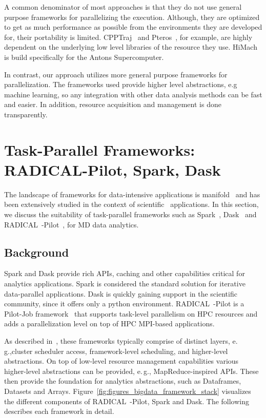 A common denominator of most approaches is that they do not use general purpose frameworks for parallelizing the execution.
Although, they are optimized to get as much performance as possible from the environments they are developed for, their portability is limited.
CPPTraj~\cite{roe2018parallelization} and Pteros~\cite{yesylevskyy2015pteros}, for example, are highly dependent on the underlying low level libraries of the resource they use.
HiMach~\cite{tiankai2008scalable} is build specifically for the Antons Supercomputer.

In contrast, our approach utilizes more general purpose frameworks for parallelization.
The frameworks used provide higher level abstractions, e.g machine learning, so any  integration with other data analysis methods can be fast and easier.
In addition, resource acquisition and management is done transparently.

\section{Task-Parallel Frameworks: RADICAL-Pilot, Spark, Dask}
\label{sec:frameworks}
The landscape of frameworks for data-intensive applications is manifold~\cite{jha2014tale,kamburugamuve2017anatomy} and has been extensively studied in the context of scientific~\cite{jha2017introducing} applications.
In this section, we discuss the suitability of task-parallel frameworks such as Spark~\cite{zaharia2010spark}, Dask~\cite{rocklin2015dask} and RADICAL~-Pilot~\cite{merzky2019using}, for MD data analytics.

\subsection{Background}
Spark and Dask provide rich APIs, caching and other capabilities critical for analytics applications.
Spark is considered the standard solution for iterative data-parallel applications.
Dask is quickly gaining support in the scientific community, since it offers only a python environment.
RADICAL~-Pilot is a Pilot-Job framework~\cite{luckow2012pstar} that supports task-level parallelism on HPC resources and adds a parallelization level on top of HPC MPI-based applications.

As described in~\cite{jha2014tale}, these frameworks typically comprise of distinct layers, e.\,g.,cluster scheduler access, framework-level scheduling, and higher-level abstractions.
On top of low-level resource management capabilities various higher-level abstractions can be provided, e.\,g., MapReduce-inspired APIs.
These then provide the foundation for analytics abstractions, such as Dataframes, Datasets and Arrays.
Figure~\ref{fig:figures_bigdata_framework_stack} visualizes the different components of RADICAL~-Pilot, Spark and Dask.
The following describes each framework in detail.

